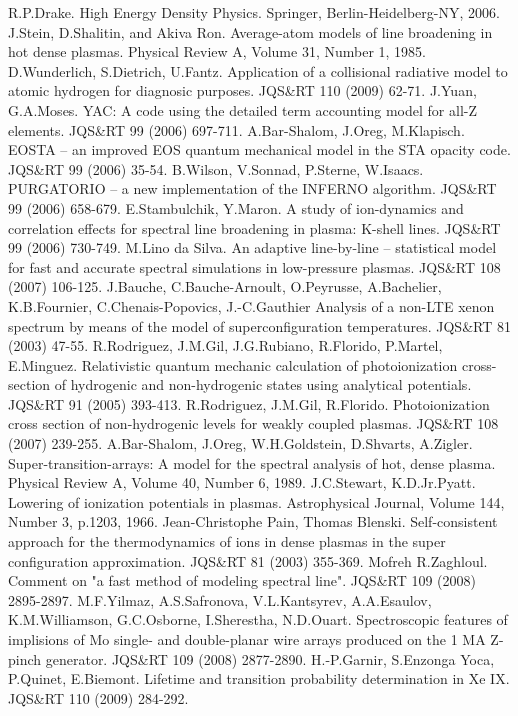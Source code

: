 \documentclass[english,12pt]{revtex4}
\begin{document}
\begin{thebibliography}{99}
R.P.Drake. High Energy Density Physics. Springer, Berlin-Heidelberg-NY, 2006.
J.Stein, D.Shalitin, and Akiva Ron. Average-atom models of line broadening in hot dense plasmas.
Physical Review A, Volume 31, Number 1, 1985.
D.Wunderlich, S.Dietrich, U.Fantz.
Application of a collisional radiative model to atomic hydrogen for diagnosic purposes.
JQS\&RT 110 (2009) 62-71.
J.Yuan, G.A.Moses. YAC: A code using the detailed term accounting model for all-Z elements.
JQS\&RT 99 (2006) 697-711.
A.Bar-Shalom, J.Oreg, M.Klapisch.
EOSTA -- an improved EOS quantum mechanical model in the STA opacity code.
JQS\&RT 99 (2006) 35-54.
B.Wilson, V.Sonnad, P.Sterne, W.Isaacs. PURGATORIO -- a new implementation of the INFERNO algorithm.
JQS\&RT 99 (2006) 658-679.
E.Stambulchik, Y.Maron.
A study of ion-dynamics and correlation effects for spectral line broadening in plasma: K-shell lines.
JQS\&RT 99 (2006) 730-749.
M.Lino da Silva.
An adaptive line-by-line -- statistical model for fast and accurate spectral simulations in low-pressure plasmas.
JQS\&RT 108 (2007) 106-125.
J.Bauche, C.Bauche-Arnoult, O.Peyrusse, A.Bachelier, K.B.Fournier, C.Chenais-Popovics, J.-C.Gauthier
Analysis of a non-LTE xenon spectrum by means of the model of superconfiguration temperatures.
JQS\&RT 81 (2003) 47-55.
R.Rodriguez, J.M.Gil, J.G.Rubiano, R.Florido, P.Martel, E.Minguez.
Relativistic quantum mechanic calculation of photoionization cross-section of hydrogenic and
non-hydrogenic states using analytical potentials.
JQS\&RT 91 (2005) 393-413.
R.Rodriguez, J.M.Gil, R.Florido.
Photoionization cross section of non-hydrogenic levels for weakly coupled plasmas.
JQS\&RT 108 (2007) 239-255.
A.Bar-Shalom, J.Oreg, W.H.Goldstein, D.Shvarts, A.Zigler.
Super-transition-arrays: A model for the spectral analysis of hot, dense plasma.
Physical Review A, Volume 40, Number 6, 1989.
J.C.Stewart, K.D.Jr.Pyatt.
Lowering of ionization potentials in plasmas.
Astrophysical Journal, Volume 144, Number 3, p.1203, 1966.
Jean-Christophe Pain, Thomas Blenski.
Self-consistent approach for the thermodynamics of ions in dense plasmas
in the super configuration approximation.
JQS\&RT 81 (2003) 355-369.
Mofreh R.Zaghloul.
Comment on "a fast method of modeling spectral line".
JQS\&RT 109 (2008) 2895-2897.
M.F.Yilmaz, A.S.Safronova, V.L.Kantsyrev, A.A.Esaulov, K.M.Williamson, G.C.Osborne, I.Sherestha, N.D.Ouart.
Spectroscopic features of implisions of Mo single- and double-planar wire arrays produced on the 1 MA Z-pinch generator.
JQS\&RT 109 (2008) 2877-2890.
H.-P.Garnir, S.Enzonga Yoca, P.Quinet, E.Biemont.
Lifetime and transition probability determination in Xe IX.
JQS\&RT 110 (2009) 284-292.
\end{thebibliography}
\end{document}
